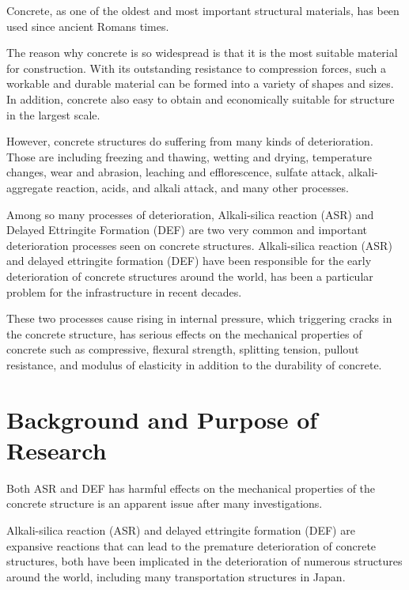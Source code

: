 

Concrete, as one of the oldest and most important structural materials, has been used since ancient Romans times.

The reason why concrete is so widespread is that it is the most suitable material for construction. With its outstanding resistance to compression forces, such a workable and durable material can be formed into a variety of shapes and sizes. In addition, concrete also easy to obtain and economically suitable for structure in the largest scale.

However, concrete structures do suffering from many kinds of deterioration. Those are including freezing and thawing, wetting and drying, temperature changes, wear and abrasion, leaching and efflorescence, sulfate attack, alkali-aggregate reaction, acids, and alkali attack, and many other processes.

Among so many processes of deterioration, Alkali-silica reaction (ASR) and Delayed Ettringite Formation (DEF) are two very common and important deterioration processes seen on concrete structures. Alkali-silica reaction (ASR) and delayed ettringite formation (DEF) have been responsible for the early deterioration of concrete structures around the world, has been a particular problem for the infrastructure in recent decades.

These two processes cause rising in internal pressure, which triggering cracks in the concrete structure, has serious effects on the mechanical properties of concrete such as compressive, flexural strength, splitting tension, pullout resistance, and modulus of elasticity in addition to the durability of concrete.

\section{Background and Purpose of Research}

Both ASR and DEF has harmful effects on the mechanical properties of the concrete structure is an apparent issue after many investigations.

Alkali-silica reaction (ASR) and delayed ettringite formation (DEF) are expansive reactions that can lead to the premature deterioration of concrete structures, both have been implicated in the deterioration of numerous structures around the world, including many transportation structures in Japan.

